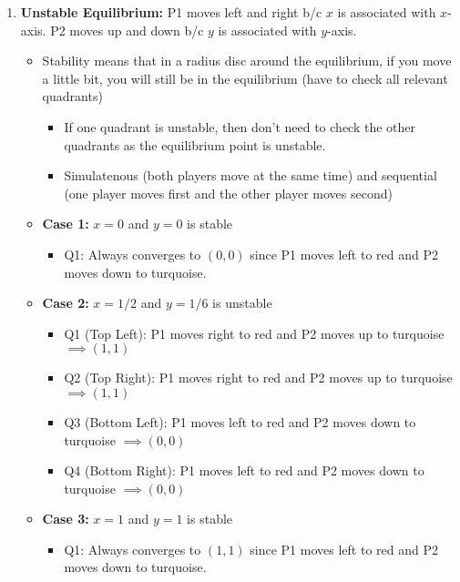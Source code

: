 \begin{example}
\begin{enumerate}
\begin{enumerate}
\begin{itemize}
\begin{itemize}
                \end{itemize}
            \end{itemize}
            \item \textbf{Unstable Equilibrium:} P1 moves left and right b/c $x$ is associated with $x$-axis. P2 moves up and down b/c $y$ is associated with $y$-axis.
            \begin{itemize}
                \item Stability means that in a radius disc around the equilibrium, if you move a little bit, you will still be in the equilibrium (have to check all relevant quadrants)
                \begin{itemize}
                    \item If one quadrant is unstable, then don't need to check the other quadrants as the equilibrium point is unstable. 
                    \item Simulatenous (both players move at the same time) and sequential (one player moves first and the other player moves second) 
                \end{itemize}
                \item \textbf{Case 1:} $x=0$ and $y=0$ is stable
                \begin{itemize}
                    \item Q1: Always converges to $(0,0)$ since P1 moves left to red and P2 moves down to turquoise.
                \end{itemize}
                \item \textbf{Case 2:} $x=1/2$ and $y=1/6$ is unstable
                \begin{itemize}
                    \item Q1 (Top Left): P1 moves right to red and P2 moves up to turquoise $\implies (1,1)$
                    \item Q2 (Top Right): P1 moves right to red and P2 moves up to turquoise $\implies (1,1)$
                    \item Q3 (Bottom Left): P1 moves left to red and P2 moves down to turquoise $\implies (0,0)$
                    \item Q4 (Bottom Right): P1 moves left to red and P2 moves down to turquoise $\implies (0,0)$
                \end{itemize}
                \item \textbf{Case 3:} $x=1$ and $y=1$ is stable
                \begin{itemize}
                    \item Q1: Always converges to $(1,1)$ since P1 moves left to red and P2 moves down to turquoise.
                \end{itemize}
            \end{itemize}
        \end{enumerate}
    \end{enumerate}
\end{example}
\newpage

